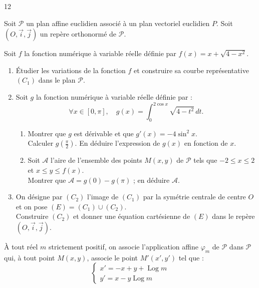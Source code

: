 \documentclass{axiobac}
\begin{document}
\begin{probleme}{12}

Soit $\mathcal{P}$ un plan affine euclidien associé à un plan vectoriel euclidien $P$. Soit $(O, \vec{i}, \vec{j})$ un repère orthonormé de $\mathcal{P}$.


Soit $f$ la fonction numérique à variable réelle définie par $f(x) = x + \sqrt{4 - x^2}$.

\begin{enumerate}
    \item Étudier les variations de la fonction $f$ et construire sa courbe représentative $(C_1)$ dans le plan $\mathcal{P}$.
    \item Soit $g$ la fonction numérique à variable réelle définie par :
    \[
    \forall x \in [0, \pi], \quad g(x) = \int_0^{2\cos x} \sqrt{4 - t^2} \, dt .
    \]
    \begin{enumerate}
        \item Montrer que $g$ est dérivable et que $g'(x) = -4\sin^2 x$. \\
        Calculer $g\left(\frac{\pi}{2}\right)$. En déduire l'expression de $g(x)$ en fonction de $x$.
        \item Soit $\mathcal{A}$ l'aire de l'ensemble des points $M(x, y)$ de $\mathcal{P}$ tels que $-2 \leqslant x \leqslant 2$ et $x \leqslant y \leqslant f(x)$. \\
        Montrer que $\mathcal{A} = g(0) - g(\pi)$ ; en déduire $\mathcal{A}$.
    \end{enumerate}
    \item On désigne par $(C_2)$ l'image de $(C_1)$ par la symétrie centrale de centre $O$ et on pose $(E) = (C_1) \cup (C_2)$. \\
    Construire $(C_2)$ et donner une équation cartésienne de $(E)$ dans le repère $(O, \vec{i}, \vec{j})$.
\end{enumerate}

\horsprogramme

À tout réel $m$ strictement positif, on associe l'application affine $\varphi_m$ de $\mathcal{P}$ dans $\mathcal{P}$ qui, à tout point $M(x, y)$, associe le point $M'(x', y')$ tel que :
\[
\begin{cases}
    x' = -x + y + \operatorname{Log} m \\
    y' = x - y \operatorname{Log} m
\end{cases}
\]


\end{probleme}
\end{document}
